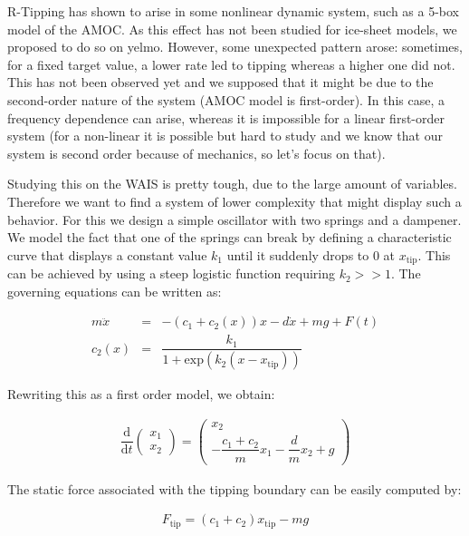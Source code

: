 \documentclass[a4paper,10pt]{report}
\numberwithin{equation}{section}
\begin{document}
R-Tipping has shown to arise in some nonlinear dynamic system, such as a 5-box model of the AMOC. As this effect has not been studied for ice-sheet models, we proposed to do so on yelmo. However, some unexpected pattern arose: sometimes, for a fixed target value, a lower rate led to tipping whereas a higher one did not. This has not been observed yet and we supposed that it might be due to the second-order nature of the system (AMOC model is first-order). In this case, a frequency dependence can arise, whereas it is impossible for a linear first-order system (for a non-linear it is possible but hard to study and we know that our system is second order because of mechanics, so let's focus on that). 

Studying this on the WAIS is pretty tough, due to the large amount of variables. Therefore we want to find a system of lower complexity that might display such a behavior. For this we design a simple oscillator with two springs and a dampener. We model the fact that one of the springs can break by defining a characteristic curve that displays a constant value $k_{1}$ until it suddenly drops to 0 at $x_{\mathrm{tip}}$. This can be achieved by using a steep logistic function requiring $k_{2} >> 1$. The governing equations can be written as:

\begin{eqnarray}
m \ddot{x} &=& -\left(c_{1}+c_{2}(x) \right)x - d \dot{x} + mg + F(t) \\
c_{2}(x) &=& \dfrac{k_{1}}{1 + \mathrm{exp}\left( k_{2} \left( x - x_{\mathrm{tip}}\right) \right) }
\end{eqnarray}

Rewriting this as a first order model, we obtain:

\begin{eqnarray}
\dfrac{\mathrm{d}}{\mathrm{d}t} \begin{pmatrix}
x_{1} \\
x_{2} 
\end{pmatrix} = \begin{pmatrix}
x_{2} \\
-\dfrac{c_{1}+c_{2}}{m} x_{1} - \dfrac{d}{m} x_{2} + g
\end{pmatrix}
\end{eqnarray}

The static force associated with the tipping boundary can be easily computed by:

\begin{eqnarray}
F_{\mathrm{tip}} = (c_{1} + c_{2}) x_{\mathrm{tip}} - mg
\end{eqnarray}
\end{document}
